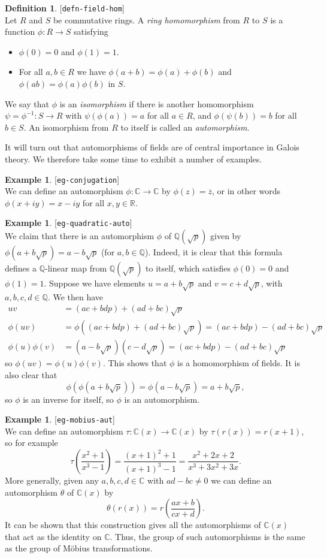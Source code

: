 \documentclass{amsart}
\newcommand{\lbl}[1]{\label{#1}\textup{[\texttt{#1}]}\ \\}
\newcommand{\lbl}{\label}
\newcommand{\Q}         {{\mathbb{Q}}}
\newcommand{\R}         {{\mathbb{R}}}
\newcommand{\C}         {{\mathbb{C}}}
\newcommand{\tht}       {\theta}
\newcommand{\ov}[1]     {\overline{#1}}
\renewcommand{\:}{\colon}
\theoremstyle{definition}
\newtheorem{definition}[theorem]{Definition}
\newtheorem{example}[theorem]{Example}
\begin{document}
\begin{definition}\lbl{defn-field-hom}
 Let $R$ and $S$ be commutative rings.  A \emph{ring homomorphism}
 from $R$ to $S$ is a function $\phi\:R\to S$ satisfying
 \begin{itemize}
  \item $\phi(0)=0$ and $\phi(1)=1$.
  \item For all $a,b\in R$ we have $\phi(a+b)=\phi(a)+\phi(b)$ and
   $\phi(ab)=\phi(a)\phi(b)$ in $S$. 
 \end{itemize}
 We say that $\phi$ is an \emph{isomorphism} if there is another
 homomorphism $\psi=\phi^{-1}\:S\to R$ with $\psi(\phi(a))=a$ for all
 $a\in R$, and $\phi(\psi(b))=b$ for all $b\in S$.  An isomorphism
 from $R$ to itself is called an \emph{automorphism}.
\end{definition}

It will turn out that automorphisms of fields are of central
importance in Galois theory.  We therefore take some time to exhibit a
number of examples.

\begin{example}\lbl{eg-conjugation}
 We can define an automorphism $\phi\:\C\to\C$ by $\phi(z)=\ov{z}$, or
 in other words $\phi(x+iy)=x-iy$ for all $x,y\in\R$.
\end{example}

\begin{example}\lbl{eg-quadratic-auto}
 We claim that there is an automorphism $\phi$ of $\Q(\sqrt{p})$ given
 by $\phi(a+b\sqrt{p})=a-b\sqrt{p}$ (for $a,b\in\Q$).  Indeed, it is
 clear that this formula defines a $\Q$-linear map from $\Q(\sqrt{p})$
 to itself, which satisfies $\phi(0)=0$ and $\phi(1)=1$.  Suppose we
 have elements $u=a+b\sqrt{p}$ and $v=c+d\sqrt{p}$, with
 $a,b,c,d\in\Q$.  We then have
 \begin{align*}
  uv &= (ac+bdp)+(ad+bc)\sqrt{p} \\
  \phi(uv) &= \phi((ac+bdp)+(ad+bc)\sqrt{p}) =
  (ac+bdp)-(ad+bc)\sqrt{p} \\
  \phi(u)\phi(v) &= (a-b\sqrt{p})(c-d\sqrt{p})
   = (ac+bdp)-(ad+bc)\sqrt{p} 
 \end{align*}
 so $\phi(uv)=\phi(u)\phi(v)$.  This shows that $\phi$ is a
 homomorphism of fields.  It is also clear that 
 \[ \phi(\phi(a+b\sqrt{p}))=\phi(a-b\sqrt{p})=a+b\sqrt{p}, \]
 so $\phi$ is an inverse for itself, so $\phi$ is an automorphism.
\end{example}

\begin{example}\lbl{eg-mobius-aut}
 We can define an automorphism $\tau\:\C(x)\to\C(x)$ by
 $\tau(r(x))=r(x+1)$, so for example
 \[ \tau\left(\frac{x^2+1}{x^3-1}\right) =
      \frac{(x+1)^2+1}{(x+1)^3-1} =
      \frac{x^2+2x+2}{x^3+3x^2+3x}.
 \] 
 More generally, given any $a,b,c,d\in\C$ with $ad-bc\neq 0$ we can
 define an automorphism $\tht$ of $\C(x)$ by 
 \[ \tht(r(x)) = r\left(\frac{ax+b}{cx+d}\right). \]
 It can be shown that this construction gives all the automorphisms of
 $\C(x)$ that act as the identity on $\C$.  Thus, the group of such
 automorphisms is the same as the group of M\"obius transformations. 
\end{example}
\end{document}
